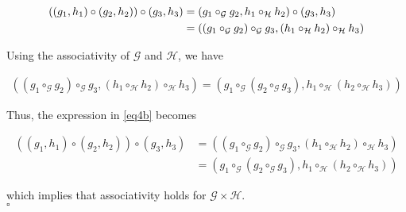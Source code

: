 \documentclass[../CryptoHW3.tex]{subfiles}
\begin{document}
\begin{flushleft}
\begin{align}
  \left( \left( g_1 , h_1 \right) \circ \left( g_2, h_2 \right) \right) \circ \left( g_3, h_3 \right) &= \left( g_1 \circ_\mathcal{G} g_2, h_1 \circ_\mathcal{H} h_2 \right) \circ \left( g_3, h_3 \right) \notag \\
  &= \left( \left(g_1 \circ_\mathcal{G} g_2\right) \circ_\mathcal{G} g_3, \left(h_1 \circ_\mathcal{H} h_2\right) \circ_\mathcal{H} h_3 \right) \label{eq4b}
\end{align}

Using the associativity of $\mathcal{G}$ and $\mathcal{H}$, we have

\begin{align*}
  \left( \left(g_1 \circ_\mathcal{G} g_2\right) \circ_\mathcal{G} g_3, \left(h_1 \circ_\mathcal{H} h_2\right) \circ_\mathcal{H} h_3 \right) = \left( g_1 \circ_\mathcal{G} \left(g_2 \circ_\mathcal{G} g_3\right), h_1 \circ_\mathcal{H} \left(h_2 \circ_\mathcal{H} h_3\right) \right)
\end{align*}

Thus, the expression in \ref{eq4b} becomes

\begin{align*}
  \left( \left( g_1 , h_1 \right) \circ \left( g_2, h_2 \right) \right) \circ \left( g_3, h_3 \right) &= \left( \left(g_1 \circ_\mathcal{G} g_2\right) \circ_\mathcal{G} g_3, \left(h_1 \circ_\mathcal{H} h_2\right) \circ_\mathcal{H} h_3 \right) \\
  &= \left( g_1 \circ_\mathcal{G} \left(g_2 \circ_\mathcal{G} g_3\right), h_1 \circ_\mathcal{H} \left(h_2 \circ_\mathcal{H} h_3\right) \right)
\end{align*}

which implies that associativity holds for $\mathcal{G} \times \mathcal{H}$. \\
$\square$



\end{flushleft}
\end{document}
